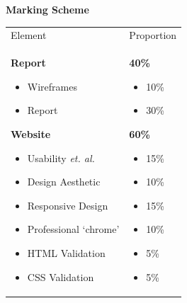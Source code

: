 \vspace{0.5cm}
\newpage
\textbf{Marking Scheme}\\


\begin{table}[h!]
     \begin{center}
     \begin{tabular}{p{5cm}  p{5cm} }
     \toprule
      \textbf\large{Element} & \textbf\large{Proportion} \\ 
    \cmidrule(r){1-1}\cmidrule(lr){2-2}
      \textbf{Report}
		      \begin{itemize}[topsep=0pt]
		      		\item[] Wireframes
		      		\item[] Report 
		      \end{itemize}
      \textbf{Website}
            	\begin{itemize}[topsep=0pt]
			      \item[] Usability \emph{et. al.}
			      \item[] Design Aesthetic
			      \item[] Responsive Design
			      \item[] Professional `chrome'
			      \item[] HTML Validation
			      \item[] CSS Validation 
      			\end{itemize}
      & 
      \textbf{40\%}
		      \begin{itemize}[topsep=0pt]
		      \item[] 10\%
		      \item[] 30\%
		      \end{itemize}
      \textbf{60\%}
            \begin{itemize}[topsep=0pt]
			      \item[] 15\%
			      \item[] 10\%
			      \item[] 15\%
			      \item[] 10\%
				  \item[] 5\%
				  \item[] 5\%		      
      		\end{itemize}
      \\ \bottomrule
      \end{tabular}
      \label{tbl:markSchemeAsmt2}
      \end{center}
 \end{table}
  

